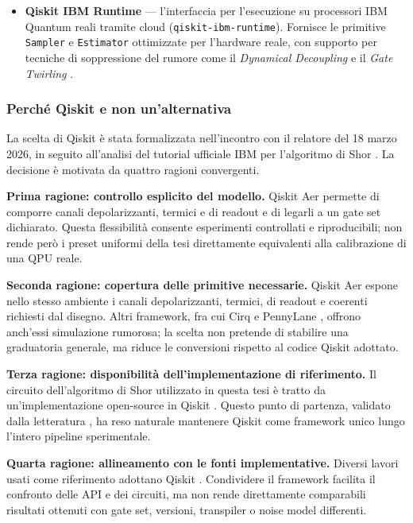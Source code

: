 \begin{onehalfspace}
\begin{itemize}
    \item \textbf{Qiskit IBM Runtime} — l'interfaccia per l'esecuzione su processori \ac{IBM} Quantum reali tramite cloud (\texttt{qiskit-ibm-runtime}). Fornisce le primitive \texttt{Sampler} e \texttt{Estimator} ottimizzate per l'hardware reale, con supporto per tecniche di soppressione del rumore come il \textit{Dynamical Decoupling} e il \textit{Gate Twirling} \cite{ibm_shor_tutorial}.

\end{itemize}

\subsubsection{Perché Qiskit e non un'alternativa}
\label{sec:confronto_framework}

La scelta di Qiskit è stata formalizzata nell'incontro con il relatore del 18 marzo 2026, in seguito all'analisi del tutorial ufficiale \ac{IBM} per l'algoritmo di Shor \cite{ibm_shor_tutorial}. La decisione è motivata da quattro ragioni convergenti.

\textbf{Prima ragione: controllo esplicito del modello.} Qiskit Aer permette di comporre canali depolarizzanti, termici e di readout e di legarli a un gate set dichiarato. Questa flessibilità consente esperimenti controllati e riproducibili; non rende però i preset uniformi della tesi direttamente equivalenti alla calibrazione di una QPU reale.

\textbf{Seconda ragione: copertura delle primitive necessarie.} Qiskit Aer espone nello stesso ambiente i canali depolarizzanti, termici, di readout e coerenti richiesti dal disegno. Altri framework, fra cui Cirq \cite{cirq2024} e PennyLane \cite{pennylane2022}, offrono anch'essi simulazione rumorosa; la scelta non pretende di stabilire una graduatoria generale, ma riduce le conversioni rispetto al codice Qiskit adottato.

\textbf{Terza ragione: disponibilità dell'implementazione di riferimento.} Il circuito dell'algoritmo di Shor utilizzato in questa tesi è tratto da un'implementazione open-source in Qiskit \cite{github_shor}. Questo punto di partenza, validato dalla letteratura \cite{skosana2021}, ha reso naturale mantenere Qiskit come framework unico lungo l'intero pipeline sperimentale.

\textbf{Quarta ragione: allineamento con le fonti implementative.} Diversi lavori usati come riferimento adottano Qiskit \cite{skosana2021, shor_hpec2023, ml_mitigation2023}. Condividere il framework facilita il confronto delle API e dei circuiti, ma non rende direttamente comparabili risultati ottenuti con gate set, versioni, transpiler o noise model differenti.


\end{onehalfspace}
